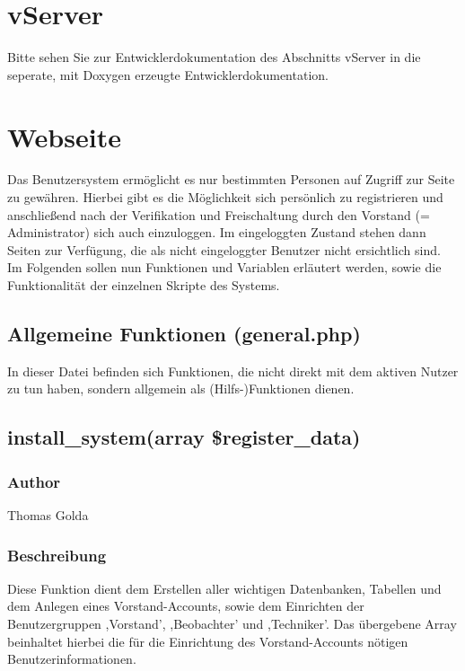\documentclass[fontsize = 12pt, paper = a4]{scrreprt}
\begin{document}
\section{vServer}

Bitte sehen Sie zur Entwicklerdokumentation des Abschnitts vServer in die seperate, mit Doxygen erzeugte Entwicklerdokumentation.


\newpage

\section{Webseite}
Das Benutzersystem ermöglicht es nur bestimmten Personen auf Zugriff zur Seite zu gewähren. Hierbei gibt es die Möglichkeit sich persönlich zu registrieren und anschließend nach der Verifikation und Freischaltung durch den Vorstand (= Administrator) sich auch einzuloggen. Im eingeloggten Zustand stehen dann Seiten zur Verfügung, die als nicht eingeloggter Benutzer nicht ersichtlich sind.\\

Im Folgenden sollen nun Funktionen und Variablen erläutert werden, sowie die Funktionalität der einzelnen Skripte des Systems.

\subsection{Allgemeine Funktionen (general.php)}
In dieser Datei befinden sich Funktionen, die nicht direkt mit dem aktiven Nutzer zu tun haben, sondern allgemein als (Hilfs-)Funktionen dienen.
\subsection*{install\_system(array \$register\_data)}
\subsubsection*{Author}
Thomas Golda
\subsubsection*{Beschreibung}
Diese Funktion dient dem Erstellen aller wichtigen Datenbanken, Tabellen und dem Anlegen eines Vorstand-Accounts, sowie dem Einrichten der Benutzergruppen ,Vorstand', ,Beobachter' und ,Techniker'. Das übergebene Array beinhaltet hierbei die für die Einrichtung des Vorstand-Accounts nötigen Benutzerinformationen.
\end{document}
